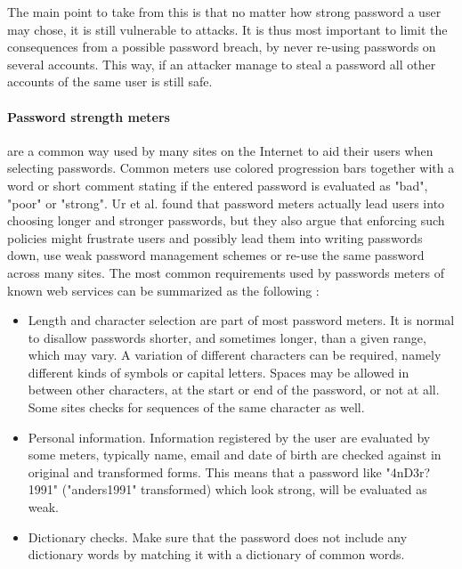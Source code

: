 \par The main point to take from this is that no matter how strong password a user may chose, it is still vulnerable to attacks. It is thus most important to limit the consequences from a possible password breach, by never re-using passwords on several accounts. This way, if an attacker manage to steal a password all other accounts of the same user is still safe. 

\paragraph{Password strength meters} are a common way used by many sites on the Internet to aid their users when selecting passwords. Common meters use colored progression bars together with a word or short comment stating if the entered password is evaluated as "bad", "poor" or "strong". Ur et al. \cite{password-meters2} found that password meters actually lead users into choosing longer and stronger passwords, but they also argue that enforcing such policies might frustrate users and possibly lead them into writing passwords down, use weak password management schemes or re-use the same password across many sites. The most common requirements used by passwords meters of known web services can be summarized as the following \cite{password-meters}:
\begin{itemize}
    \item{Length and character selection} are part of most password meters. It is normal to disallow passwords shorter, and sometimes longer, than a given range, which may vary. A variation of different characters can be required, namely different kinds of symbols or capital letters. Spaces may be allowed in between other characters, at the start or end of the password, or not at all. Some sites checks for sequences of the same character as well.
    \item{Personal information.} Information registered by the user are evaluated by some meters, typically name, email and date of birth are checked against in original and transformed forms. This means that a password like "4nD3r?1991" ("anders1991" transformed) which look strong, will be evaluated as weak.
    \item{Dictionary checks.} Make sure that the password does not include any dictionary words by matching it with a dictionary of common words. 
\end{itemize}

%

